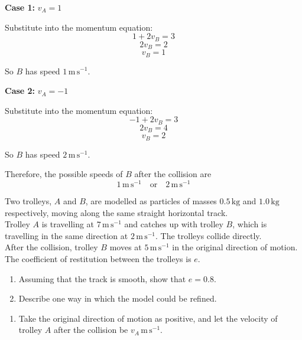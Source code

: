 \documentclass[leqno]{article}
\begin{document}
\begin{enumerate}[
  label=\textbf{\arabic*.},
  leftmargin=*,
  topsep=0pt,
  partopsep=0pt,
  parsep=0pt
]
\begin{djsSolution}
\textbf{Case 1:} $v_A=1$

Substitute into the momentum equation:
\[
1+2v_B=3
\]
\[
2v_B=2
\]
\[
v_B=1
\]

So $B$ has speed $1\,\mathrm{m\,s^{-1}}$.

\textbf{Case 2:} $v_A=-1$

Substitute into the momentum equation:
\[
-1+2v_B=3
\]
\[
2v_B=4
\]
\[
v_B=2
\]

So $B$ has speed $2\,\mathrm{m\,s^{-1}}$.

Therefore, the possible speeds of $B$ after the collision are
\[
1\,\mathrm{m\,s^{-1}} \quad \text{or} \quad 2\,\mathrm{m\,s^{-1}}
\]
\end{djsSolution}


\newpage

\questionitem

Two trolleys, $A$ and $B$, are modelled as particles of masses $0.5\,\mathrm{kg}$ and $1.0\,\mathrm{kg}$ respectively, moving along the same straight horizontal track. \\

Trolley $A$ is travelling at $7\,\mathrm{m}\,\mathrm{s}^{-1}$ and catches up with trolley $B$, which is travelling in the same direction at $2\,\mathrm{m}\,\mathrm{s}^{-1}$. The trolleys collide directly. \\

After the collision, trolley $B$ moves at $5\,\mathrm{m}\,\mathrm{s}^{-1}$ in the original direction of motion. \\

The coefficient of restitution between the trolleys is $e$. \\
\begin{enumerate}[label=\textbf{(\alph*)}]
  \item Assuming that the track is smooth, show that $e=0.8$.  \\
  \item Describe one way in which the model could be refined.  \\
\end{enumerate}

\vspace*{10pt}

\begin{djsSolution}
\begin{enumerate}[label=\textbf{(\alph*)}]
  \item Take the original direction of motion as positive, and let the velocity of trolley $A$ after the collision be $v_A\,\mathrm{m}\,\mathrm{s}^{-1}$.


\end{enumerate}
\end{djsSolution}
\end{enumerate}
\end{document}
